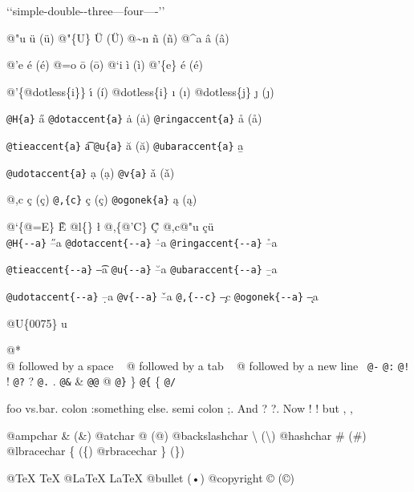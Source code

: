 \documentclass{book}
\renewcommand{\_}{\Texinfounderscore\discretionary{}{}{}}
\begin{document}
{`\hbox{}`simple-double-\hbox{}-three---four----'\hbox{}'\leavevmode{}\\

%
%
%
%

@"u \"{u} (ü)
@"\{U\} \"{U} (Ü) 
@\~{}n \~{n} (ñ)
@\^{}a \^{a} (â)

@'e \'{e} (é)
@=o \={o} (ō)
@`i \`{i} (ì)
@'\{e\} \'{e} (é)

@'\{@dotless\{i\}\} \'{\i{}} (í)
@dotless\{i\} \i{} (ı)
@dotless\{j\} \j{} (ȷ)

\texttt{@H\{a\}} \H{a}
\texttt{@dotaccent\{a\}} \.{a} (ȧ)
\texttt{@ringaccent\{a\}} \r{a} (å)

\texttt{@tieaccent\{a\}} \t{a}
\texttt{@u\{a\}} \u{a} (ă)
\texttt{@ubaraccent\{a\}} \b{a}

\texttt{@udotaccent\{a\}} \d{a} (ạ)
\texttt{@v\{a\}} \v{a} (ǎ)

@,c \c{c} (ç)
\texttt{@,\{c\}} \c{c} (ç)
\texttt{@ogonek\{a\}} \k{a} (ą)

@`\{@=E\} \`{\={E}}
@l\{\} \l{}
@,\{@'C\} \c{\'{C}}
@,c@"u \c{c}\"{u} \leavevmode{}\\

\texttt{@H\{{-}{-}a\}} \H{--a}
\texttt{@dotaccent\{{-}{-}a\}} \.{--a}
\texttt{@ringaccent\{{-}{-}a\}} \r{--a}

\texttt{@tieaccent\{{-}{-}a\}} \t{--a}
\texttt{@u\{{-}{-}a\}} \u{--a}
\texttt{@ubaraccent\{{-}{-}a\}} \b{--a}

\texttt{@udotaccent\{{-}{-}a\}} \d{--a}
\texttt{@v\{{-}{-}a\}} \v{--a}
\texttt{@,\{{-}{-}c\}} \c{--c}
\texttt{@ogonek\{{-}{-}a\}} \k{--a}

@U\{0075\} u

@* \leavevmode{}\\
@ followed by a space
\ {}
@ followed by a tab
\ {}
@ followed by a new line
\ {}\texttt{@-} \-{}
\texttt{@:} \@
\texttt{@!} \@!
\texttt{@?} \@?
\texttt{@.} \@.
\texttt{@\&} \&
\texttt{@@} @
\texttt{@\}} \}
\texttt{@\{} \{
\texttt{@/} 

foo vs.\@ bar. 
colon :\@And something else.
semi colon ;\@.
And ? ?\@.
Now ! !\@@
but , ,\@

@ampchar \& (\&)
@atchar @ (@)
@backslashchar \textbackslash{} (\textbackslash{})
@hashchar \# (\#)
@lbracechar \{ (\{)
@rbracechar \} (\})

@TeX \TeX{}
@LaTeX \LaTeX{}
@bullet \textbullet{} (•)
@copyright \copyright{} (©)

}
\end{document}
